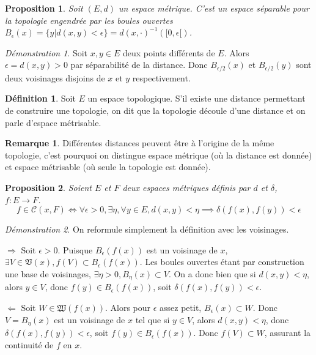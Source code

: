 \documentclass[a4paper, 11pt, french]{book}
\newenvironment{itemise}{\itemize}{\enditemize}
\theoremstyle{plain} %
\newtheorem{proposition}{Proposition}
\theoremstyle{definition} %
\newtheorem{definition}{Définition}
\newtheorem{remarque}{Remarque}
\theoremstyle{remark} %
\newtheorem*{demonstration}{Démonstration}
\newcommand{\1}{\mathds{1}}
\newcommand{\cont}{\mathcal{C}}
\newcommand{\inv}[1]{#1^{-1}}
\begin{document}
\begin{proposition}
	Soit $(E, d)$ un espace métrique.
	C'est un espace séparable pour la topologie engendrée par les boules ouvertes $B_\epsilon(x)=\{y|d(x, y)<\epsilon\}=\inv{d(x, \cdot)}([0, \epsilon[)$.
\end{proposition}

\begin{demonstration}
	Soit $x, y\in E$ deux points différents de $E$.
	Alors $\epsilon=d(x, y)>0$ par séparabilité de la distance.
	Donc $B_{\epsilon/2}(x)$ et $B_{\epsilon/2}(y)$ sont deux voisinages disjoins de $x$ et $y$ respectivement.
\end{demonstration}

\begin{definition}
	Soit $E$ un espace topologique.
	S’il existe une distance permettant de construire une topologie, on dit que la topologie découle d’une distance et on parle d’espace métrisable.
\end{definition}

\begin{remarque}
	Différentes distances peuvent être à l’origine de la même topologie, c’est pourquoi on distingue espace métrique (où la distance est donnée) et espace métrisable (où seule la topologie est donnée).
\end{remarque}

\begin{proposition}
	Soient $E$ et $F$ deux espaces métriques définis par $d$ et $\delta$, $f:E\rightarrow F$.
	$$
		f\in\cont(x, F)
		\iff
		\forall\epsilon>0, \exists\eta, \forall y\in E, d(x, y)<\eta\implies\delta(f(x), f(y))<\epsilon
	$$
\end{proposition}

\begin{demonstration}
	On reformule simplement la définition avec les voisinages.
	\begin{itemise}
		\item[$\Rightarrow$] Soit $\epsilon>0$.
		Puisque $B_\epsilon(f(x))$ est un voisinage de $x$, $\exists V\in\mathfrak{V}(x), f(V)\subset B_\epsilon(f(x))$.
		Les boules ouvertes étant par construction une base de voisinages, $\exists\eta>0, B_\eta(x)\subset V$.
		On a donc bien que si $d(x, y)<\eta$, alors $y\in V$, donc $f(y)\in B_\epsilon(f(x))$, soit $\delta(f(x), f(y))<\epsilon$.
		\item[$\Leftarrow$] Soit $W\in\mathfrak{W}(f(x))$.
		Alors pour $\epsilon$ assez petit, $B_\epsilon(x)\subset W$.
		Donc $V=B_\eta(x)$ est un voisinage de $x$ tel que si $y\in V$, alors $d(x, y)<\eta$, donc $\delta(f(x), f(y))<\epsilon$, soit $f(y)\in B_\epsilon(f(x))$.
		Donc $f(V)\subset W$, assurant la continuité de $f$ en $x$.
	\end{itemise}
\end{demonstration}
\end{document}
